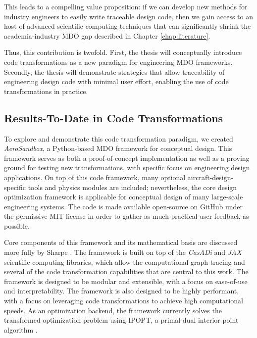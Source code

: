 \documentclass[12pt,vi,oneside,table]{report}
\begin{document}
    This leads to a compelling value proposition: if we can develop new methods for industry engineers to easily write traceable design code, then we gain access to an host of advanced scientific computing techniques that can significantly shrink the academia-industry MDO gap described in Chapter \ref{chap:literature}.

    Thus, this contribution is twofold. First, the thesis will conceptually introduce code transformations as a new paradigm for engineering MDO frameworks. Secondly, the thesis will demonstrate strategies that allow traceability of engineering design code with minimal user effort, enabling the use of code transformations in practice.

    \subsection*{Results-To-Date in Code Transformations}


    To explore and demonstrate this code transformation paradigm, we created \textit{AeroSandbox}, a Python-based MDO framework for conceptual design. This framework serves as both a proof-of-concept implementation as well as a proving ground for testing new transformations, with specific focus on engineering design applications. On top of this code framework, many optional aircraft-design-specific tools and physics modules are included; nevertheless, the core design optimization framework is applicable for conceptual design of many large-scale engineering systems. The code is made available open-source on GitHub under the permissive MIT license in order to gather as much practical user feedback as possible.

    Core components of this framework and its mathematical basis are discussed more fully by Sharpe \cite{sharpe_aerosandbox_2021}. The framework is built on top of the \textit{CasADi} \cite{casadi} and \textit{JAX} \cite{jax} scientific computing libraries, which allow the computational graph tracing and several of the code transformation capabilities that are central to this work. The framework is designed to be modular and extensible, with a focus on ease-of-use and interpretability. The framework is also designed to be highly performant, with a focus on leveraging code transformations to achieve high computational speeds. As an optimization backend, the framework currently solves the transformed optimization problem using IPOPT, a primal-dual interior point algorithm \cite{wachter_implementation_2006}.
\end{document}
